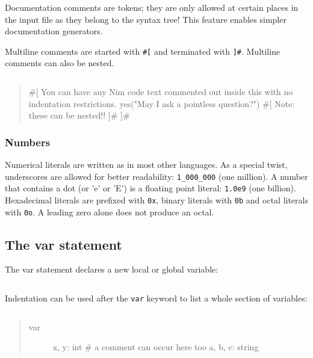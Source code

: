 Documentation comments are tokens; they are only allowed at certain
places in the input file as they belong to the syntax tree! This feature
enables simpler documentation generators.

Multiline comments are started with \texttt{\#{[}} and terminated with
\texttt{{]}\#}. Multiline comments can also be nested.

\begin{verbatim}
\end{verbatim}

\begin{quote}
\#{[} You can have any Nim code text commented out inside this with no
indentation restrictions. yes("May I ask a pointless question?") \#{[}
Note: these can be nested!! {]}\# {]}\#
\end{quote}

\hypertarget{numbers}{%
\subsubsection{Numbers}\label{numbers}}

Numerical literals are written as in most other languages. As a special
twist, underscores are allowed for better readability:
\texttt{1\_000\_000} (one million). A number that contains a dot (or 'e'
or 'E') is a floating point literal: \texttt{1.0e9} (one billion).
Hexadecimal literals are prefixed with \texttt{0x}, binary literals with
\texttt{0b} and octal literals with \texttt{0o}. A leading zero alone
does not produce an octal.

\hypertarget{the-var-statement}{%
\subsection{The var statement}\label{the-var-statement}}

The var statement declares a new local or global variable:

\begin{verbatim}
\end{verbatim}

Indentation can be used after the \texttt{var} keyword to list a whole
section of variables:

\begin{verbatim}
\end{verbatim}

\begin{quote}
\begin{description}
\item[var]
x, y: int \# a comment can occur here too a, b, c: string
\end{description}
\end{quote}


